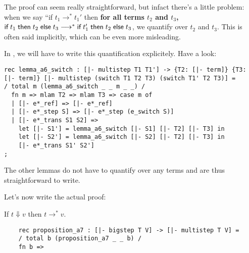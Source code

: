 The \beluga proof can seem really straightforward, but infact there's a little
problem: when we say ``if $t_1 \rightarrow^* t_1'$ then {\bf for all terms
$t_2$ and $t_3$,} $\textsf{if\;} t_1 \textsf{\;then\;} t_2 \textsf{\;else\;} t_3 \longrightarrow^* \textsf{if\;} t_1' \textsf{\;then\;} t_2 \textsf{\;else\;} t_3$,
we quantify over $t_2$ and $t_3$. This is often said implicitly, which can be
even more misleading.

In \beluga, we will have to write this quantification explicitely. Have a look:

\begin{lstlisting}
rec lemma_a6_switch : [|- multistep T1 T1'] -> {T2: [|- term]} {T3: [|- term]} [|- multistep (switch T1 T2 T3) (switch T1' T2 T3)] =
/ total m (lemma_a6_switch _ _ m _ _) /
  fn m => mlam T2 => mlam T3 => case m of 
  | [|- e*_ref] => [|- e*_ref]
  | [|- e*_step S] => [|- e*_step (e_switch S)]
  | [|- e*_trans S1 S2] =>
    let [|- S1'] = lemma_a6_switch [|- S1] [|- T2] [|- T3] in
    let [|- S2'] = lemma_a6_switch [|- S2] [|- T2] [|- T3] in
    [|- e*_trans S1' S2']
;
\end{lstlisting}

The other lemmas do not have to quantify over any terms and are thus
straightforward to write.

Let's now write the actual proof:
\begin{proposition}[A7]
  If $t \Downarrow v$ then $t \longrightarrow^* v.$
  \begin{lstlisting}
    rec proposition_a7 : [|- bigstep T V] -> [|- multistep T V] =
    / total b (proposition_a7 _ _ b) /
    fn b =>
  \end{lstlisting}
\end{proposition}


